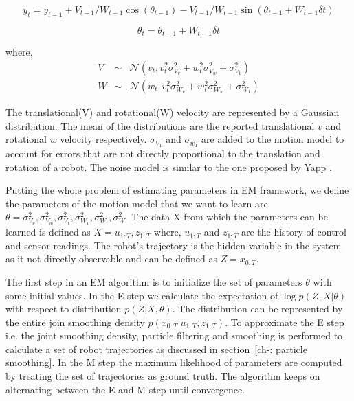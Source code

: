 \documentclass[12pt]{dalcsthesis}
\begin{document}
\begin{equation}
\label{eq:velocity motion model_y}
y_{t}=y_{t-1}+V_{t-1}/W_{t-1} \cos(\theta_{t-1})- V_{t-1}/W_{t-1} \sin(\theta_{t-1} + W_{t-1} \delta t)
\end{equation}

\begin{equation}
\label{eq:velocity motion model_theta}
\theta_{t}=\theta_{t-1}+ W_{t-1} \delta t
\end{equation}

where,
\begin{eqnarray}
V &\sim& \mathcal{N}(v_{t},v_{t}^{2}\sigma_{V_{v}}^{2}+w_{t}^{2}\sigma_{V_{w}}^{2}+\sigma_{V_{1}}^{2})\\
W &\sim& \mathcal{N}(w_{t},v_{t}^{2}\sigma_{W_{v}}^{2}+w_{t}^{2}\sigma_{W_{w}}^{2}+\sigma_{W_{1}}^{2})
\end{eqnarray}

The translational(V) and rotational(W) velocity are represented by a Gaussian distribution. The mean of the distributions are the reported translational $v$ and rotational $w$ velocity respectively. $\sigma_{V_{1}} $ and $\sigma_{w_{1}}$ are added to the motion model to account for errors that are not directly proportional to the translation and rotation of a robot. The noise model is similar to the one proposed by Yapp \cite{Yap2008}.

Putting the whole problem of estimating parameters in EM framework, we define the parameters of the motion model that we want to learn are $\theta={\sigma_{V_{v}}^{2},\sigma_{V_{w}}^{2},\sigma_{V_{1}}^{2},\sigma_{W_{v}}^{2},\sigma_{W_{t}}^{2},\sigma_{W_{1}}^{2}}$
The data X from which the parameters can be learned is defined as $X={u_{1:T},z_{1:T}}$
where, $u_{1:T}$ and $z_{1:T}$ are the history of control and sensor readings. The robot's trajectory is the hidden variable in the system as it not directly observable and can be defined as $Z=x_{0:T}$.

The first step in an EM algorithm is to initialize the set of parameters $\theta$ with some initial values. In the E step we calculate the expectation of $\log p(Z,X|\theta)$ with respect to distribution $p(Z|X,\theta)$. The distribution can be represented by the entire join smoothing density $p(x_{0:T}|u_{1:T},z_{1:T})$. To approximate the E step i.e. the joint smoothing density, particle filtering and smoothing is performed to calculate a set of robot trajectories as discussed in section~\ref{ch-: particle smoothing}. In the M step the maximum likelihood of parameters are computed by treating the set of trajectories as ground truth. The algorithm keeps on alternating between the E and M step until convergence. 
\end{document}
